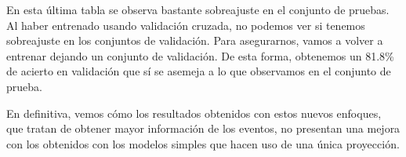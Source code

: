 \documentclass[a4paper,12pt,oneside,titlepage]{book}
\begin{document}
En esta última tabla se observa bastante sobreajuste en el conjunto de pruebas. Al haber entrenado usando validación cruzada, no podemos ver si tenemos sobreajuste en los conjuntos de validación. Para asegurarnos, vamos a volver a entrenar dejando un conjunto de validación. De esta forma, obtenemos un 81.8\% de acierto en validación que sí se asemeja a lo que observamos en el conjunto de prueba.
   
En definitiva, vemos cómo los resultados obtenidos con estos nuevos enfoques, que tratan de obtener mayor información de los eventos, no presentan una mejora con los obtenidos con los modelos simples que hacen uso de una única proyección.

  



\end{document}
